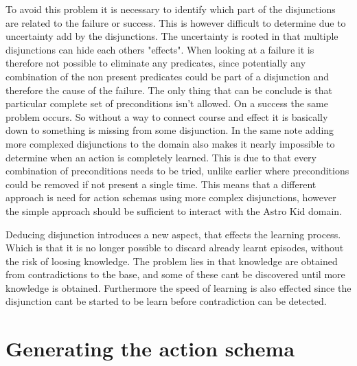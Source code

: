 	To avoid this problem it is necessary to identify which part of the disjunctions are related to the failure or success. This is however difficult to determine due to uncertainty add by the disjunctions. The uncertainty is rooted in that multiple disjunctions can hide each others "effects". When looking at a failure it is therefore not possible to eliminate any predicates, since potentially any combination of the non present predicates could be part of a disjunction and therefore the cause of the failure. The only thing that can be conclude is that particular complete set of preconditions isn't allowed. On a success the same problem occurs. So without a way to connect course and effect it is basically down to something is missing from some disjunction. In the same note adding more complexed disjunctions to the domain also makes it nearly impossible to determine when an action is completely learned. This is due to that every combination of preconditions needs to be tried, unlike earlier where preconditions could be removed if not present a single time. This means that a different approach is need for action schemas using more complex disjunctions, however the simple approach should be sufficient to interact with the Astro Kid domain.
	 
	

%	
	


	Deducing disjunction introduces a new aspect, that effects the learning process.  Which is that it is no longer possible to discard already learnt episodes,  without the risk of loosing knowledge. The problem lies in that knowledge are obtained from contradictions to the base, and some of these cant be discovered until more knowledge is obtained. Furthermore the speed of learning is also effected since the disjunction cant be started to be learn before contradiction can be detected. 
	
	
	
	
\section{Generating the action schema}	
	
